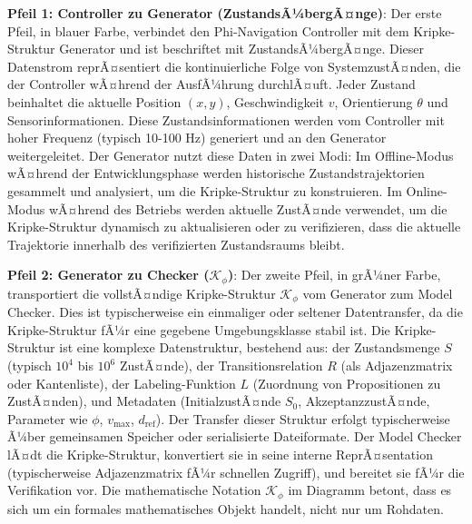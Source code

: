 ﻿\documentclass[a4paper,12pt]{article}
\theoremstyle{definition}
\begin{document}
\textbf{Pfeil 1: Controller zu Generator (ZustandsÃ¼bergÃ¤nge)}: Der erste Pfeil, in blauer Farbe, verbindet den Phi-Navigation Controller mit dem Kripke-Struktur Generator und ist beschriftet mit ZustandsÃ¼bergÃ¤nge. Dieser Datenstrom reprÃ¤sentiert die kontinuierliche Folge von SystemzustÃ¤nden, die der Controller wÃ¤hrend der AusfÃ¼hrung durchlÃ¤uft. Jeder Zustand beinhaltet die aktuelle Position $(x, y)$, Geschwindigkeit $v$, Orientierung $\theta$ und Sensorinformationen. Diese Zustandsinformationen werden vom Controller mit hoher Frequenz (typisch 10-100 Hz) generiert und an den Generator weitergeleitet. Der Generator nutzt diese Daten in zwei Modi: Im Offline-Modus wÃ¤hrend der Entwicklungsphase werden historische Zustandstrajektorien gesammelt und analysiert, um die Kripke-Struktur zu konstruieren. Im Online-Modus wÃ¤hrend des Betriebs werden aktuelle ZustÃ¤nde verwendet, um die Kripke-Struktur dynamisch zu aktualisieren oder zu verifizieren, dass die aktuelle Trajektorie innerhalb des verifizierten Zustandsraums bleibt.

\textbf{Pfeil 2: Generator zu Checker ($\mathcal{K}_\phi$)}: Der zweite Pfeil, in grÃ¼ner Farbe, transportiert die vollstÃ¤ndige Kripke-Struktur $\mathcal{K}_\phi$ vom Generator zum Model Checker. Dies ist typischerweise ein einmaliger oder seltener Datentransfer, da die Kripke-Struktur fÃ¼r eine gegebene Umgebungsklasse stabil ist. Die Kripke-Struktur ist eine komplexe Datenstruktur, bestehend aus: der Zustandsmenge $S$ (typisch $10^4$ bis $10^6$ ZustÃ¤nde), der Transitionsrelation $R$ (als Adjazenzmatrix oder Kantenliste), der Labeling-Funktion $L$ (Zuordnung von Propositionen zu ZustÃ¤nden), und Metadaten (InitialzustÃ¤nde $S_0$, AkzeptanzzustÃ¤nde, Parameter wie $\phi$, $v_{\max}$, $d_{\text{ref}}$). Der Transfer dieser Struktur erfolgt typischerweise Ã¼ber gemeinsamen Speicher oder serialisierte Dateiformate. Der Model Checker lÃ¤dt die Kripke-Struktur, konvertiert sie in seine interne ReprÃ¤sentation (typischerweise Adjazenzmatrix fÃ¼r schnellen Zugriff), und bereitet sie fÃ¼r die Verifikation vor. Die mathematische Notation $\mathcal{K}_\phi$ im Diagramm betont, dass es sich um ein formales mathematisches Objekt handelt, nicht nur um Rohdaten.
\end{document}
